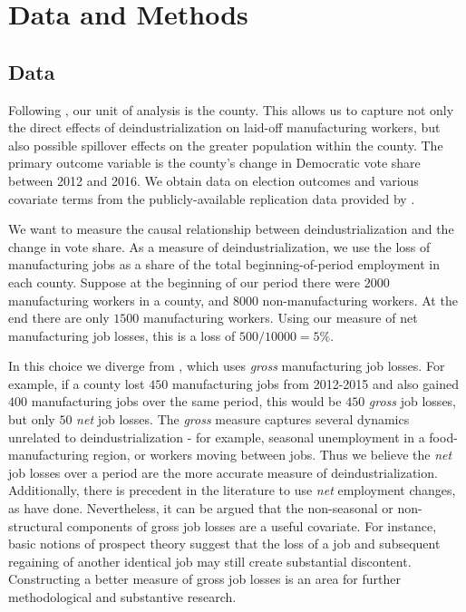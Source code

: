 \documentclass[]{AEA}
\begin{document}
\section{Data and Methods} 
\label{datamethods}

\subsection{Data} 
\label{datasec}

Following \cite{Baccini21}, our unit of analysis is the county. This
allows us to capture not only the direct effects of deindustrialization
on laid-off manufacturing workers, but also possible spillover effects
on the greater population within the county. The primary outcome
variable is the county's change in Democratic vote share between 2012
and 2016. We obtain data on election outcomes and various covariate
terms from the publicly-available replication data provided by
\cite{Baccini21}.

We want to measure the causal relationship between deindustrialization
and the change in vote share. As a measure of deindustrialization, we
use the loss of manufacturing jobs as a share of the total
beginning-of-period employment in each county. Suppose at the beginning
of our period there were \(2000\) manufacturing workers in a county, and
\(8000\) non-manufacturing workers. At the end there are only \(1500\)
manufacturing workers. Using our measure of net manufacturing job
losses, this is a loss of \(500/10000 = 5\%.\)

In this choice we diverge from \cite{Baccini21}, which uses \emph{gross}
manufacturing job losses. For example, if a county lost \(450\)
manufacturing jobs from 2012-2015 and also gained \(400\) manufacturing
jobs over the same period, this would be \(450\) \emph{gross} job
losses, but only \(50\) \emph{net} job losses. The \emph{gross} measure
captures several dynamics unrelated to deindustrialization - for
example, seasonal unemployment in a food-manufacturing region, or
workers moving between jobs. Thus we believe the \emph{net} job losses
over a period are the more accurate measure of deindustrialization.
Additionally, there is precedent in the literature to use \emph{net}
employment changes, as \cite{Autor21} have done. Nevertheless, it can be
argued that the non-seasonal or non-structural components of gross job
losses are a useful covariate. For instance, basic notions of prospect
theory suggest that the loss of a job and subsequent regaining of
another identical job may still create substantial discontent.
Constructing a better measure of gross job losses is an area for further
methodological and substantive research.
\end{document}
